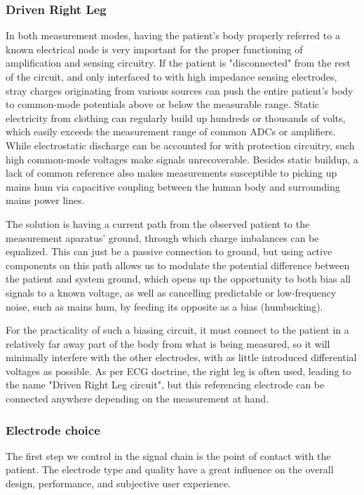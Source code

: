 \documentclass{thesis}
\begin{document}
\subsubsection{Driven Right Leg}

In both measurement modes, having the patient's body properly referred to a known electrical node is very important for the proper functioning of amplification and sensing circuitry. If the patient is "disconnected" from the rest of the circuit, and only interfaced to with high impedance sensing electrodes, stray charges originating from various sources can push the entire patient's body to common-mode potentials above or below the measurable range. Static electricity from clothing can regularly build up hundreds or thousands of volts, which easily exceeds the measurement range of common ADCs or amplifiers. While electrostatic discharge can be accounted for with protection circuitry, such high common-mode voltages make signals unrecoverable. Besides static buildup, a lack of common reference also makes measurements susceptible to picking up mains hum via capacitive coupling between the human body and surrounding mains power lines.

The solution is having a current path from the observed patient to the measurement aparatus' ground, through which charge imbalances can be equalized. This can just be a passive connection to ground, but using active components on this path allows us to modulate the potential difference between the patient and system ground, which opens up the opportunity to both bias all signals to a known voltage, as well as cancelling predictable or low-frequency noise, such as mains hum, by feeding its opposite as a bias (humbucking).

For the practicality of such a biasing circuit, it must connect to the patient in a relatively far away part of the body from what is being measured, so it will minimally interfere with the other electrodes,  with as little introduced differential voltages as possible. As per ECG doctrine, the right leg is often used, leading to the name "Driven Right Leg circuit", but this referencing electrode can be connected anywhere depending on the measurement at hand.

\subsubsection{Electrode choice}

The first step we control in the signal chain is the point of contact with the patient. The electrode type and quality have a great influence on the overall design, performance, and subjective user experience.
\end{document}
